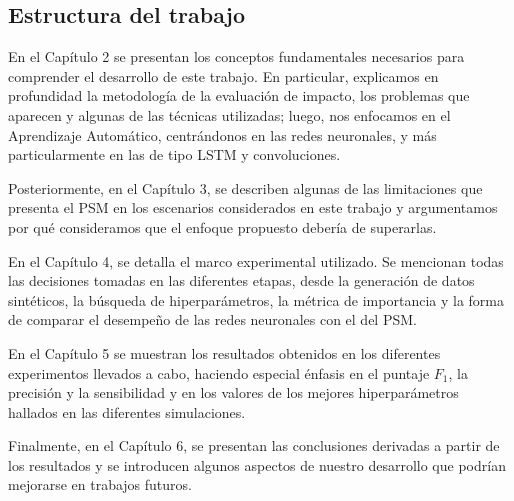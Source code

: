 \documentclass[../main.tex]{subfiles}
\begin{document}


\subsection{Estructura del trabajo}
En el Capítulo 2 se presentan los conceptos fundamentales necesarios para comprender el
desarrollo de este trabajo. En particular, explicamos en profundidad la metodología de la
evaluación de impacto, los problemas que aparecen y algunas de las técnicas utilizadas;
luego, nos enfocamos en el Aprendizaje Automático, centrándonos en las redes neuronales, y
más particularmente en las de tipo LSTM y convoluciones.

Posteriormente, en el Capítulo 3, se describen algunas de las limitaciones que presenta el
PSM en los escenarios considerados en este trabajo y argumentamos por qué consideramos que
el enfoque propuesto debería de superarlas.

En el Capítulo 4, se detalla el marco experimental utilizado. Se mencionan todas las
decisiones tomadas en las diferentes etapas, desde la generación de datos sintéticos, la
búsqueda de hiperparámetros, la métrica de importancia y la forma de comparar el desempeño de las
redes neuronales con el del PSM.

En el Capítulo 5 se muestran los resultados obtenidos en los diferentes experimentos
llevados a cabo, haciendo especial énfasis en el puntaje \(F_1\), la precisión y la
sensibilidad y en los valores de los mejores hiperparámetros hallados en las diferentes
simulaciones.

Finalmente, en el Capítulo 6, se presentan las conclusiones derivadas a partir de los
resultados y se introducen algunos aspectos de nuestro desarrollo que podrían mejorarse en
trabajos futuros.
\end{document}
